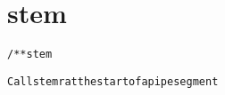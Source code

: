 \section{stem}
\begin{shaded}
\begin{alltt}
/** stem

  Call stemr at the start of a pipe segment

\end{alltt}
\end{shaded}
